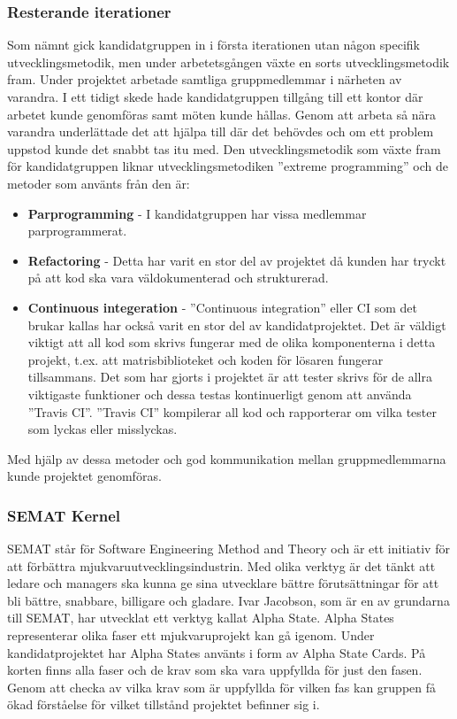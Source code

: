 \subsubsection{Resterande iterationer}
\label{sec:resterande}
Som nämnt gick kandidatgruppen in i första iterationen utan någon specifik utvecklingsmetodik, men under arbetetsgången växte en sorts utvecklingsmetodik fram.
\newline
\newline
Under projektet arbetade samtliga gruppmedlemmar i närheten av varandra. I ett tidigt skede hade kandidatgruppen tillgång till ett kontor där arbetet kunde genomföras samt möten kunde hållas. Genom att arbeta så nära varandra underlättade det att hjälpa till där det behövdes och om ett problem uppstod kunde det snabbt tas itu med.
\newline
\newline
Den utvecklingsmetodik som växte fram för kandidatgruppen liknar utvecklingsmetodiken ''extreme programming'' och de metoder som använts från den är: 
\begin{itemize}
  \item \textbf{Parprogramming} - I kandidatgruppen har vissa medlemmar parprogrammerat. 
  \item \textbf{Refactoring} - Detta har varit en stor del av projektet då kunden har tryckt på att kod ska vara väldokumenterad och strukturerad.
  \item \textbf{Continuous integeration} - ''Continuous integration'' eller CI som det brukar kallas har också varit en stor del av kandidatprojektet. Det är väldigt viktigt att all kod som skrivs fungerar med de olika komponenterna i detta projekt, t.ex. att matrisbiblioteket och koden för lösaren fungerar tillsammans. Det som har gjorts i projektet är att tester skrivs för de allra viktigaste funktioner och dessa testas kontinuerligt genom att använda ''Travis CI''. ''Travis CI'' kompilerar all kod och rapporterar om vilka tester som lyckas eller misslyckas.
\end{itemize}
Med hjälp av dessa metoder och god kommunikation mellan gruppmedlemmarna kunde projektet genomföras. 

\subsubsection{SEMAT Kernel}
SEMAT står för Software Engineering Method and Theory och är ett initiativ för att förbättra mjukvaruutvecklingsindustrin. Med olika verktyg är det tänkt att ledare och managers ska kunna ge sina utvecklare bättre förutsättningar för att bli bättre, snabbare, billigare och gladare. \citep{semat} 
\newline
\newline
Ivar Jacobson, som är en av grundarna till SEMAT, har utvecklat ett verktyg kallat Alpha State. Alpha States representerar olika faser ett mjukvaruprojekt kan gå igenom.
Under kandidatprojektet har Alpha States använts i form av Alpha State Cards. På korten finns alla faser och de krav som ska vara uppfyllda för just den fasen. Genom att checka av vilka krav som är uppfyllda för vilken fas kan gruppen få ökad förståelse för vilket tillstånd projektet befinner sig i.  

